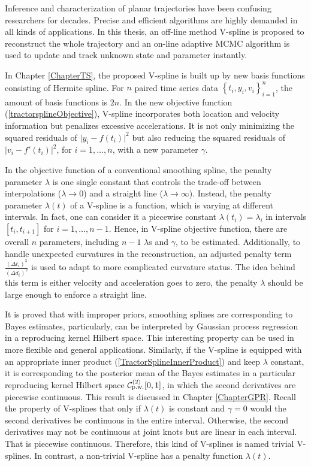 
Inference and characterization of planar trajectories have been confusing researchers for decades. Precise and efficient algorithms are highly demanded in all kinds of applications. In this thesis, an off-line method V-spline is proposed to reconstruct the whole trajectory and an on-line adaptive MCMC algorithm is used to update and track unknown state and parameter instantly. 

In Chapter \ref{ChapterTS}, the proposed V-spline is built up by new basis functions consisting of Hermite spline. For $n$ paired time series data $\left\lbrace t_i,y_i,v_i\right\rbrace_{i=1}^{n}$, the amount of basis functions is $2n$. In the new objective function (\ref{tractorsplineObjective}), V-spline incorporates both location and velocity information but penalizes excessive accelerations. It is not only minimizing the squared residuals of $\lvert y_i-f(t_i)\rvert^2$ but also reducing the squared residuals of $\lvert v_i-f'(t_i)\rvert^2$, for $i=1,\ldots,n$, with a new parameter $\gamma$. 

In the objective function of a conventional smoothing spline, the penalty parameter $\lambda$ is one single constant that controls the trade-off between interpolations ($\lambda\to 0$) and a straight line ($\lambda\to \infty$). Instead, the penalty parameter $\lambda(t)$ of a V-spline is a function, which is varying at different intervals. In fact, one can consider it a piecewise constant $\lambda(t_i)=\lambda_i$ in intervals $[t_i,t_{i+1}]$ for $i=1,\ldots,n-1$. Hence, in V-spline objective function, there are overall $n$ parameters, including $n-1$ $\lambda$s and $\gamma$, to be estimated. Additionally, to handle unexpected curvatures in the reconstruction, an adjusted penalty term $\frac{(\Delta t_i)^3}{(\Delta d_i)^2}$ is used to adapt to more complicated curvature status. The idea behind this term is either velocity and acceleration goes to zero, the penalty $\lambda$ should be large enough to enforce a straight line. 

It is proved that with improper priors, smoothing splines are corresponding to Bayes estimates, particularly, can be interpreted by Gaussian process regression in a reproducing kernel Hilbert space. This interesting property can be used in more flexible and general applications. Similarly, if the V-spline is equipped with an appropriate inner product (\ref{TractorSplineInnerProduct}) and keep $\lambda$ constant, it is corresponding to the posterior mean of the Bayes estimates in a particular reproducing kernel Hilbert space $\mathcal{C}_{\mbox{\scriptsize p.w.}}^{(2)}[0,1]$, in which the second derivatives are piecewise continuous. This result is discussed in Chapter \ref{ChapterGPR}. Recall the property of V-splines that only if $\lambda(t)$ is constant and $\gamma=0$ would the second derivatives be continuous in the entire interval. Otherwise, the second derivatives may not be continuous at joint knots but are linear in each interval. That is piecewise continuous. Therefore, this kind of V-splines is named trivial V-splines. In contrast, a non-trivial V-spline has a penalty function $\lambda(t)$. 

